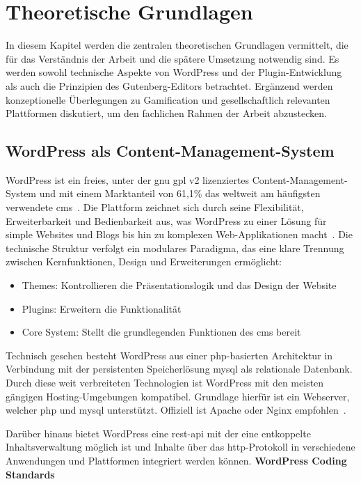 \chapter{Theoretische Grundlagen}
In diesem Kapitel werden die zentralen theoretischen Grundlagen vermittelt, die für das Verständnis der Arbeit und die spätere Umsetzung notwendig sind.
Es werden sowohl technische Aspekte von WordPress und der Plugin-Entwicklung als auch die Prinzipien des Gutenberg-Editors betrachtet.
Ergänzend werden konzeptionelle Überlegungen zu Gamification und gesellschaftlich relevanten Plattformen diskutiert, um den fachlichen Rahmen der Arbeit abzustecken.

\section{WordPress als Content-Management-System}
WordPress ist ein freies, unter der \gls{gnu} \gls{gpl} v2 lizenziertes Content-Management-System und mit einem Marktanteil von 61,1\% das weltweit am häufigsten verwendete \gls{cms}~\cite{statista2025cms}.
Die Plattform zeichnet sich durch seine Flexibilität, Erweiterbarkeit und Bedienbarkeit aus, was WordPress zu einer Lösung für simple Websites und Blogs bis hin zu komplexen Web-Applikationen macht~\cite{patel2019review}.
Die technische Struktur verfolgt ein modulares Paradigma, das eine klare Trennung zwischen Kernfunktionen, Design und Erweiterungen ermöglicht:
\begin{itemize}

 \item Themes: Kontrollieren die Präsentationslogik und das Design der Website

 \item Plugins: Erweitern die Funktionalität

 \item Core System: Stellt die grundlegenden Funktionen des \gls{cms} bereit

\end{itemize}
Technisch gesehen besteht WordPress aus einer \gls{php}-basierten Architektur in Verbindung mit der persistenten Speicherlösung \gls{mysql} als relationale Datenbank.
Durch diese weit verbreiteten Technologien ist WordPress mit den meisten gängigen Hosting-Umgebungen kompatibel.
Grundlage hierfür ist ein Webserver, welcher \gls{php} und \gls{mysql} unterstützt.
Offiziell ist Apache oder Nginx empfohlen~\cite{wordpress2024requirements}.

Darüber hinaus bietet WordPress eine \gls{rest}-\gls{api} mit der eine entkoppelte Inhaltsverwaltung möglich ist und Inhalte über das \gls{http}-Protokoll in verschiedene Anwendungen und Plattformen integriert werden können.
\textbf{WordPress Coding Standards}


